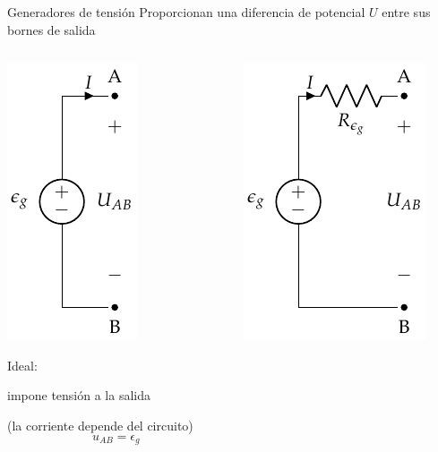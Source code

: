 \documentclass[aspectratio=169, xcolor={usenames,svgnames,dvipsnames}]{beamer}
\begin{document}
\begin{frame}{Generadores de tensión}
    Proporcionan una diferencia de potencial $U$ entre sus bornes de salida
    \vspace{-5mm}
    
    \begin{columns}[T]
    \begin{column}{0.4\columnwidth}
        \begin{center}
         \hspace*{-10mm}\includegraphics[height=0.5\textheight]{../figs/FuenteTensionIdealDC.pdf}  

        \vspace{2mm}  
        \alert{Ideal}: 
        
        impone tensión a la salida   
        
        \small{(la corriente depende del circuito)}
        \begin{equation*}
            u_{AB}=\epsilon_g
        \end{equation*}
        \end{center}
    \end{column}
    \begin{column}{0.38\columnwidth}
        \begin{center}
        \hspace*{-10mm}\includegraphics[height=0.5\textheight]{../figs/FuenteTensionRealDC.pdf}


\end{center}
\end{column}
\end{columns}
\end{frame}
\end{document}

